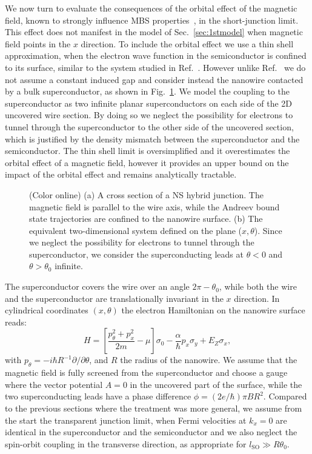 \documentclass[twocolumn, notitlepage, 10pt, aps, floatfix, showpacs, prb, citeautoscript]{revtex4-1}
\newcommand{\comment}[1]{}
\begin{document}
\comment{Orbital effect is important, and we analyze it in thin shell limit.}
We now turn to evaluate the consequences of the orbital effect of the magnetic field, known to strongly influence MBS properties~\cite{Lim2013, osca_majorana_2014, Osca2015, Nijholt2016}, in the short-junction limit.
This effect does not manifest in the model of Sec.~\ref{sec:1stmodel} when magnetic field points in the $x$ direction.
To include the orbital effect we use a thin shell approximation, when the electron wave function in the semiconductor is confined to its surface, similar to the system studied in Ref.~.
However unlike Ref.~ we do not assume a constant induced gap and consider instead the nanowire contacted by a bulk superconductor, as shown in Fig.~\ref{fig:orb}.
We model the coupling to the superconductor as two infinite planar superconductors on each side of the 2D uncovered wire section.
By doing so we neglect the possibility for electrons to tunnel through the superconductor to the other side of the uncovered section, which is justified by the density mismatch between the superconductor and the semiconductor.
The thin shell limit is oversimplified and it overestimates the orbital effect of a magnetic field, however it provides an upper bound on the impact of the orbital effect and remains analytically tractable.

\begin{figure}[tb]
\caption{(Color online) (a) A cross section of a NS hybrid junction. The magnetic field is parallel to the wire axis, while the Andreev bound state trajectories are confined to the nanowire surface.
(b) The equivalent two-dimensional system defined on the plane ($x,\theta$).
Since we neglect the possibility for electrons to tunnel through the superconductor, we consider the superconducting leads at $\theta<0$ and $\theta>\theta_0$ infinite.
\label{fig:orb}
}
\end{figure}

The superconductor covers the wire over an angle $2\pi-\theta_0$, while both the wire and the superconductor are translationally invariant in the $x$ direction.
In cylindrical coordinates $(x, \theta)$ the electron Hamiltonian on the nanowire surface reads:
\begin{equation}
H=\left[\frac{p_\theta^2 + p_x^2}{2m}
-\mu\right]\sigma_0-\frac{\alpha}{\hbar}p_x\sigma_y
+E_Z\sigma_x,
\end{equation}
with $p_\theta = -i\hbar R^{-1}\partial/\partial \theta$, and $R$ the radius of the nanowire.
We assume that the magnetic field is fully screened from the superconductor and choose a gauge where the vector potential $A=0$ in the uncovered part of the surface, while the two superconducting leads have a phase difference $\phi = (2 e/\hbar) \pi B R^2$.
Compared to the previous sections where the treatment was more general, we assume from the start the transparent junction limit, when Fermi velocities at $k_x=0$ are identical in the superconductor and the semiconductor and we also neglect the spin-orbit coupling in the transverse direction, as appropriate for $l_\textrm{SO} \gg R \theta_0$.
\end{document}
